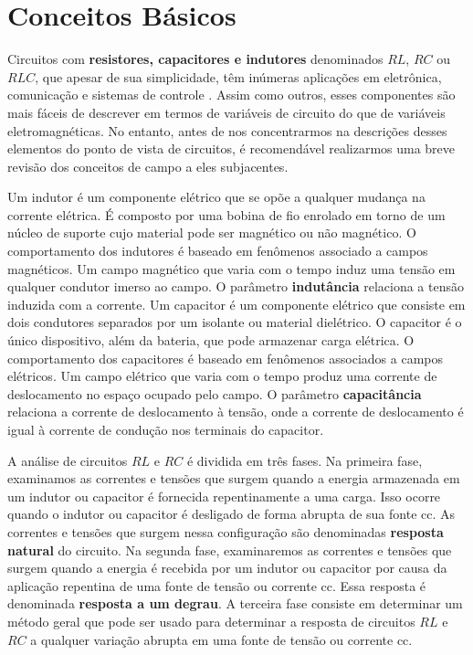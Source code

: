 \documentclass[
	12pt,				%
	oneside,			%
	a4paper,			%
	english,			%
	french,				%
	spanish,			%
	brazil				%
	]{abntex2}
\begin{document}
\chapter{Conceitos Básicos}

Circuitos com \textbf{resistores, capacitores e indutores} denominados $RL$, $RC$ ou $RLC$, que apesar de sua simplicidade, têm inúmeras aplicações em eletrônica, comunicação e sistemas de controle \cite{sadiku}. Assim como outros, esses componentes são mais fáceis de descrever em termos de variáveis de circuito do que de variáveis eletromagnéticas. No entanto, antes de nos concentrarmos na descrições desses elementos do ponto de vista de circuitos, é recomendável realizarmos uma breve revisão dos conceitos de campo a eles subjacentes. 

Um indutor é um componente elétrico que se opõe a qualquer mudança na corrente elétrica. É composto por uma bobina de fio enrolado em torno de um núcleo de suporte cujo material pode ser magnético ou não magnético. O comportamento dos indutores é baseado em fenômenos associado a campos magnéticos. Um  campo magnético que varia com o tempo induz uma tensão em qualquer condutor imerso ao campo. O parâmetro \textbf{indutância} relaciona a tensão induzida com a corrente. Um capacitor é um componente elétrico que consiste em dois condutores separados por um isolante ou material dielétrico. O capacitor é o único dispositivo, além da bateria, que pode armazenar carga elétrica. O comportamento dos capacitores é baseado em fenômenos associados a campos elétricos. Um campo elétrico que varia com o tempo produz uma corrente de deslocamento no espaço ocupado pelo campo. O parâmetro \textbf{capacitância} relaciona a corrente de deslocamento à tensão, onde a corrente de deslocamento é igual à corrente de condução nos terminais do capacitor.

A análise de circuitos $RL$ e $RC$ é dividida em três fases. Na primeira fase, examinamos as correntes e tensões que surgem quando a energia armazenada em um indutor ou capacitor é fornecida repentinamente a uma carga. Isso ocorre quando o indutor ou capacitor é desligado de forma abrupta de sua fonte cc. As correntes e tensões que surgem nessa configuração são denominadas \textbf{resposta natural} do circuito. Na segunda fase, examinaremos as correntes e tensões que surgem quando a energia é recebida por um indutor ou capacitor por causa da aplicação repentina de uma fonte de tensão ou corrente cc. Essa resposta é denominada \textbf{resposta a um degrau}. A terceira fase consiste em determinar um método geral que pode ser usado para determinar a resposta de circuitos $RL$ e $RC$ a qualquer variação abrupta em uma fonte de tensão ou corrente cc.
\end{document}
